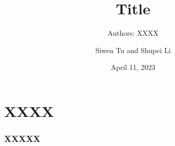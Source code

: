 \documentclass[notes, 10pt, aspectratio=169]{beamer}
\title{Title}
\subtitle{Authors: XXXX}
\author{Siwen Tu and Shupei Li}
\institute[LIACS]{Leiden Institute of Advanced Computer Science}
\date{April 11, 2023}
\begin{document}
\begin{frame}[plain]
	\titlepage
\end{frame}

\begin{frame}
	\tableofcontents
\end{frame}

\section{XXXX}
\begin{frame}
    \frametitle{XXXXX}
\end{frame}
\end{document}
